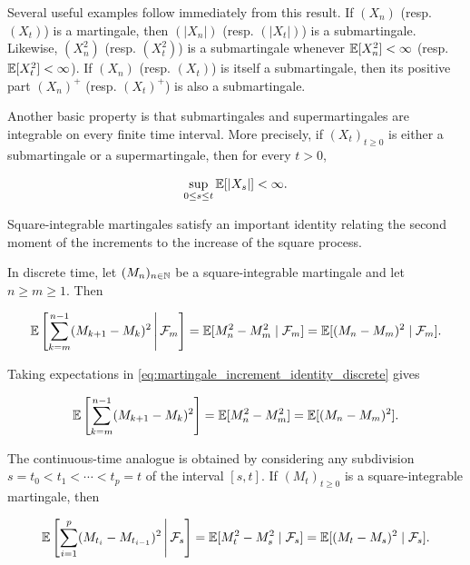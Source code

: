 \documentclass[../Main.tex]{subfiles}
\begin{document}
Several useful examples follow immediately from this result. If $(X_n)$
(resp. $(X_t)$) is a martingale, then $(|X_n|)$
(resp. $(|X_t|)$) is a submartingale. Likewise,
$(X_n^2)$ (resp. $(X_t^2)$) is a submartingale whenever
$\mathbb{E}[X_n^2]<\infty$ (resp. $\mathbb{E}[X_t^2]<\infty$). If $(X_n)$
(resp. $(X_t)$) is itself a submartingale, then its positive part
$(X_n)^+$ (resp. $(X_t)^+$) is also a submartingale.

Another basic property is that submartingales and supermartingales are
integrable on every finite time interval. More precisely, if
$(X_t)_{t\ge0}$ is either a submartingale or a supermartingale, then for
every $t>0$,

\begin{equation}
\sup_{0\le s\le t}\mathbb{E}[|X_s|]<\infty.
\label{eq:martingale_local_L1_bound}
\end{equation}

Square-integrable martingales satisfy an important identity relating the
second moment of the increments to the increase of the square process.

In discrete time, let $(M_n)_{n\in\mathbb{N}}$ be a square-integrable martingale
and let $n\ge m\ge1$. Then

\begin{equation}
\mathbb{E}\left[
\sum_{k=m}^{n-1}(M_{k+1}-M_k)^2
\,\middle|\,\mathcal F_m
\right]
=
\mathbb{E}[M_n^2-M_m^2\mid\mathcal F_m]
=
\mathbb{E}[(M_n-M_m)^2\mid\mathcal F_m].
\label{eq:martingale_increment_identity_discrete}
\end{equation}

Taking expectations in \eqref{eq:martingale_increment_identity_discrete}
gives

\begin{equation}
\mathbb{E}\left[
\sum_{k=m}^{n-1}(M_{k+1}-M_k)^2
\right]
=
\mathbb{E}[M_n^2-M_m^2]
=
\mathbb{E}[(M_n-M_m)^2].
\label{eq:martingale_increment_identity_discrete_expectation}
\end{equation}

The continuous-time analogue is obtained by considering any subdivision
$s=t_0<t_1<\cdots<t_p=t$ of the interval $[s,t]$. If
$(M_t)_{t\ge0}$ is a square-integrable martingale, then

\begin{equation}
\mathbb{E}\left[
\sum_{i=1}^{p}(M_{t_i}-M_{t_{i-1}})^2
\,\middle|\,\mathcal F_s
\right]
=
\mathbb{E}[M_t^2-M_s^2\mid\mathcal F_s]
=
\mathbb{E}[(M_t-M_s)^2\mid\mathcal F_s].
\label{eq:martingale_increment_identity_continuous}
\end{equation}
\end{document}
